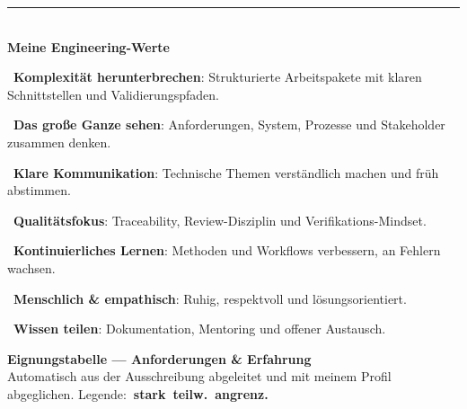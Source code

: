 \documentclass[10pt,a4paper]{moderncv}
\newcommand{\badge}[2]{\textcolor{#1}{\footnotesize\textbf{#2}}}
\newcommand{\strong}{\badge{strongc}{\faCircle\ stark}}
\newcommand{\partialm}{\badge{partialc}{\faCircleHalfStroke\ teilw.}}
\newcommand{\adjacent}{\badge{adjac}{\faRegistered\ angrenz.}}
\begin{document}
\medskip
{\color{accent}\rule{\linewidth}{0.6pt}}\\[3pt]
{\small\bfseries\color{accent}Meine Engineering-Werte}\par\smallskip
{\small
\newcommand{\valitem}[3]{\par\noindent{\color{accent}#1}~\textbf{#2}: #3\par\vspace{1.5pt}}
\valitem{\faSitemap}{Komplexität herunterbrechen}{Strukturierte Arbeitspakete mit klaren Schnittstellen und Validierungspfaden.}
\valitem{\faDiagramProject}{Das große Ganze sehen}{Anforderungen, System, Prozesse und Stakeholder zusammen denken.}
\valitem{\faComments}{Klare Kommunikation}{Technische Themen verständlich machen und früh abstimmen.}
\valitem{\faCheckDouble}{Qualitätsfokus}{Traceability, Review-Disziplin und Verifikations-Mindset.}
\valitem{\faSeedling}{Kontinuierliches Lernen}{Methoden und Workflows verbessern, an Fehlern wachsen.}
\valitem{\faHandsHolding}{Menschlich \& empathisch}{Ruhig, respektvoll und lösungsorientiert.}
\valitem{\faShare}{Wissen teilen}{Dokumentation, Mentoring und offener Austausch.}
}

\clearpage

{\Large\bfseries\color{accent}Eignungstabelle — Anforderungen \& Erfahrung}\\[2pt]
{\small\color{light}Automatisch aus der Ausschreibung abgeleitet und mit meinem
Profil abgeglichen. Legende:\;\strong\;\;\partialm\;\;\adjacent}

\medskip
\end{document}
